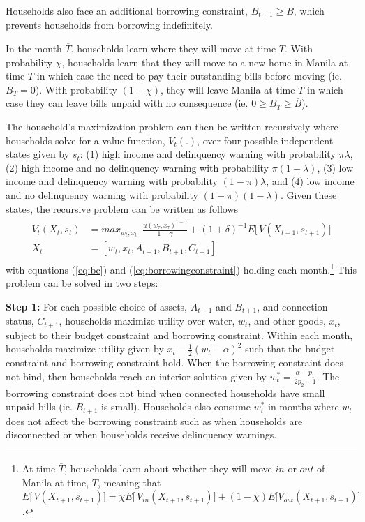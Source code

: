 \documentclass[12pt,table]{article}
\begin{document}
Households also face an additional borrowing constraint, $ B_{t+1} \geq \overline{B}$, which prevents households from borrowing indefinitely.  

In the month $\overline{T}$, households learn where they will move at time $T$. With probability $\chi$, households learn that they will move to a new home in Manila at time $T$ in which case the need to pay their outstanding bills before moving (ie. $B_T=0$).  With probability $(1-\chi)$, they will leave Manila at time $T$ in which case they can leave bills unpaid with no consequence (ie. $0\geq B_T \geq \overline{B}$).

The household's maximization problem can then be written recursively where households solve for a value function, $V_t(.)$, over four possible independent states given by $s_{t}$: (1) high income and delinquency warning with probability $\pi\lambda$, (2) high income and no delinquency warning with probability $\pi(1-\lambda)$, (3) low income and delinquency warning with probability $(1-\pi)\lambda$, and (4) low income and no delinquency warning with probability $(1-\pi)(1-\lambda)$.  Given these states, the recursive problem can be written as follows
\begin{align}
\label{eq:valmax}
\begin{split}
V_t(X_{t},s_t) &= max_{w_t,x_{t}} \,\,\, \frac{u(w_{\tau},x_{\tau})^{1-\gamma}}{1-\gamma}   + (1+\delta)^{-1}  E \Big[\, V(X_{t+1},s_{t+1})\Big] \\
X_t &= [w_t,x_t,A_{t+1},B_{t+1},C_{t+1}] 
\end{split}
\end{align}
with equations (\ref{eq:bc}) and (\ref{eq:borrowingconstraint}) holding each month.\footnote{At time $\overline{T}$, households learn about whether they will move $in$ or $out$ of Manila at time, $T$, meaning that $E \Big[\, V(X_{t+1},s_{t+1})\Big] =  \chi E \Big[\,V_{in}(X_{t+1},s_{t+1})\Big] + (1-\chi) E\Big[V_{out}(X_{t+1},s_{t+1})\Big]$.}  This problem can be solved in two steps: %


\textbf{Step 1:} For each possible choice of assets, $A_{t+1}$ and $B_{t+1}$, and connection status, $C_{t+1}$, households maximize utility over water, $w_t$, and other goods, $x_t$, subject to their budget constraint and borrowing constraint.  Within each month, households maximize utility given by $ x_t -  \frac{1}{2} (w_t - \alpha)^2 $ such that the budget constraint and borrowing constraint hold.  When the borrowing constraint does not bind, then households reach an interior solution given by $w_t^{*} =  \frac{ \alpha - p_1}{2p_2 + 1}$.  The borrowing constraint does not bind when connected households have small unpaid bills (ie. $B_{t+1}$ is small).  Households also consume $w_t^{*}$ in months where $w_t$ does not affect the borrowing constraint such as when households are disconnected or when households receive delinquency warnings.
\end{document}
